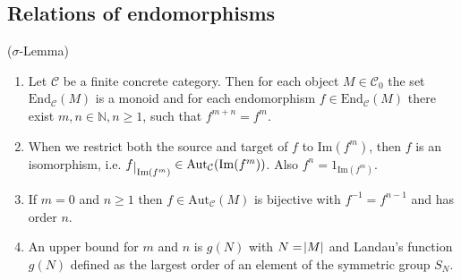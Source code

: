 %
\noindent\begin{minipage}[t]{.55\textwidth}\vspace{0pt}%
\subsection{Relations of endomorphisms}
\begin{lemma}{($\sigma$-Lemma)}
\begin{enumerate}
\renewcommand{\labelenumi}{(\theenumi)}
\item
Let $\mathcal{C}$ be a finite concrete category. Then for each object $M \in \mathcal{C}_{0}$ the set
$\mathrm{End}_{\mathcal{C}}(M)$ is a monoid and for each endomorphism $f \in \mathrm{End}_{\mathcal{C}}(M)$
there exist $m,n \in \mathbb{N}, n\geq 1$, such that $f^{m+n}=f^{m}$.
\item When we restrict both the source and target of $f$ to $\mathrm{Im}(f^{m})$, then $f$ is an isomorphism, i.e.
$f\restrict{\mathrm{Im}(f^{m})} \in \mathrm{Aut}_{\mathcal{C}}(\mathrm{Im}(f^{m}))$. Also $f^{n} = 1_{\mathrm{Im}(f^{m})}$.
\item If $m = 0$ and $n \geq 1$ then $f \in \mathrm{Aut}_{\mathcal{C}}(M)$ is bijective with $f^{-1} = f^{n-1}$ and has order $n$.
\item An upper bound for $m$ and $n$ is $g(N)$ with $N = \abs{M}$ and Landau's function $g(N)$
defined as the largest order of an element of the symmetric group $S_{N}$.
\end{enumerate}
\end{lemma}
\vspace{0pt}%
\end{minipage}
%
